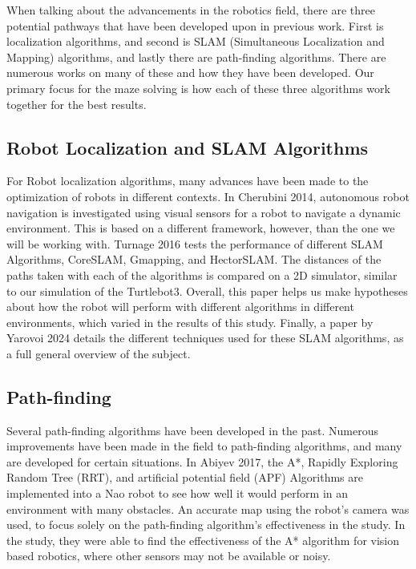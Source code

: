 \documentclass{article}
\begin{document}
When talking about the advancements in the robotics field, there are three potential pathways that have been developed upon in previous work. First is localization algorithms, and second is SLAM (Simultaneous Localization and Mapping) algorithms, and lastly there are path-finding algorithms. There are numerous works on many of these and how they have been developed. Our primary focus for the maze solving is how each of these three algorithms work together for the best results. 

\subsection{Robot Localization and SLAM Algorithms}


For Robot localization algorithms, many advances have been made to the optimization of robots in different contexts. In Cherubini 2014, autonomous robot navigation is investigated using visual sensors for a robot to navigate a dynamic environment. This is based on a different framework, however, than the one we will be working with. Turnage 2016 tests the performance of different SLAM Algorithms, CoreSLAM, Gmapping, and HectorSLAM. The distances of the paths taken with each of the algorithms is compared on a 2D simulator, similar to our simulation of the Turtlebot3. Overall, this paper helps us make hypotheses about how the robot will perform with different algorithms in different environments, which varied in the results of this study. Finally, a paper by Yarovoi 2024 details the different techniques used for these SLAM algorithms, as a full general overview of the subject.


\subsection{Path-finding}


Several path-finding algorithms have been developed in the past. Numerous improvements have been made in the field to path-finding algorithms, and many are developed for certain situations. In Abiyev 2017, the A*, Rapidly Exploring Random Tree (RRT), and artificial potential field (APF) Algorithms are implemented into a Nao robot to see how well it would perform in an environment with many obstacles. An accurate map using the robot's camera was used, to focus solely on the path-finding algorithm's effectiveness in the study. In the study, they were able to find the effectiveness of the A* algorithm for vision based robotics, where other sensors may not be available or noisy. 
\end{document}
